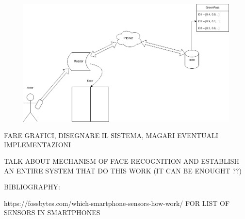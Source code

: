 \documentclass[12pt]{article}
\begin{document}
\begin{figure}[H]
    \includegraphics[width=\textwidth,height=\textheight,keepaspectratio]{./Images/Graphic_System.png}
    \label{47_1}
\end{figure}

FARE GRAFICI, DISEGNARE IL SISTEMA, MAGARI EVENTUALI IMPLEMENTAZIONI

TALK ABOUT MECHANISM OF FACE RECOGNITION AND ESTABLISH AN ENTIRE SYSTEM THAT DO THIS WORK (IT CAN BE ENOUGHT ??)


BIBLIOGRAPHY:

https://fossbytes.com/which-smartphone-sensors-how-work/ FOR LIST OF SENSORS IN SMARTPHONES
\end{document}
